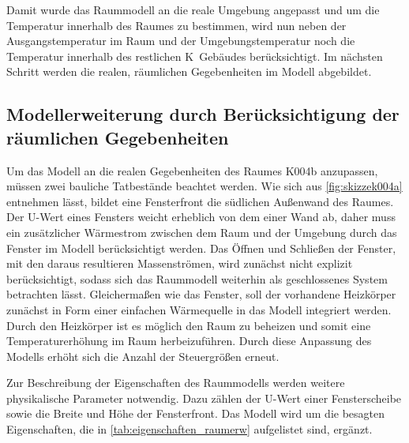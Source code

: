 Damit wurde das Raummodell an die reale Umgebung angepasst und um die Temperatur innerhalb des Raumes zu bestimmen, wird nun neben der Ausgangstemperatur im Raum und der Umgebungstemperatur noch die Temperatur innerhalb des restlichen K~Gebäudes berücksichtigt. Im nächsten Schritt werden die realen, räumlichen Gegebenheiten im Modell abgebildet.


\subsection{Modellerweiterung durch Berücksichtigung der räumlichen Gegebenheiten}

Um das Modell an die realen Gegebenheiten des Raumes K004b anzupassen, müssen zwei bauliche Tatbestände beachtet werden. Wie sich aus \ref{fig:skizzek004a} entnehmen lässt, bildet eine Fensterfront die südlichen Außenwand des Raumes. Der U-Wert eines Fensters weicht erheblich von dem einer Wand ab, daher muss ein zusätzlicher Wärmestrom zwischen dem Raum und der Umgebung durch das Fenster im Modell berücksichtigt werden. Das Öffnen und Schließen der Fenster, mit den daraus resultieren Massenströmen, wird zunächst nicht explizit berücksichtigt, sodass  sich das Raummodell weiterhin als geschlossenes System betrachten lässt. 
Gleichermaßen wie das Fenster, soll der vorhandene Heizkörper zunächst in Form einer einfachen Wärmequelle in das Modell integriert werden. Durch den Heizkörper ist es möglich den Raum zu beheizen und somit eine Temperaturerhöhung im Raum herbeizuführen. Durch diese Anpassung des Modells erhöht sich die Anzahl der Steuergrößen erneut. 

Zur Beschreibung der Eigenschaften des Raummodells werden weitere physikalische Parameter notwendig. Dazu zählen der U-Wert einer Fensterscheibe sowie die Breite und Höhe der Fensterfront. Das Modell wird um die besagten Eigenschaften, die in \ref{tab:eigenschaften_raumerw} aufgelistet sind, ergänzt.

